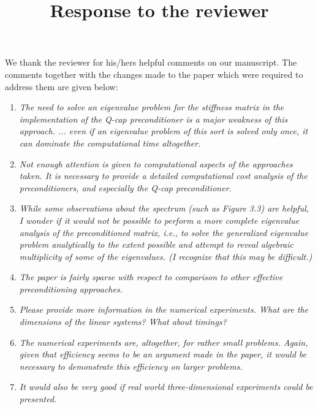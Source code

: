 \documentclass[10pt, a4paper]{article}
\title{\large{Response to the reviewer}}
\date{}
\begin{document}
\maketitle

We thank the reviewer for his/hers helpful comments on our manuscript. The
comments together with the changes made to the paper which were required to
address them are given below:
\begin{enumerate}
  \item{\textit{
The need to solve an eigenvalue problem for the stiffness matrix in the implementation 
of the Q-cap preconditioner is a major weakness of this approach. ... even if an eigenvalue 
problem of this sort is solved only once, it can dominate the computational time altogether.
}
}
  \item{\textit{
Not enough attention is given to computational aspects of the approaches taken. It is 
necessary to provide a detailed computational cost analysis of the preconditioners, 
and especially the Q-cap preconditioner. 
}
}
  \item{\textit{
While some observations about the spectrum (such as Figure 3.3) are helpful, I wonder if 
it would not be possible to perform a more complete eigenvalue analysis of the preconditioned 
matrix, i.e., to solve the generalized eigenvalue problem analytically to the extent possible 
and attempt to reveal algebraic multiplicity of some of the eigenvalues. (I recognize that this 
may be difficult.)
}
}
  \item{\textit{
The paper is fairly sparse with respect to comparison to other effective preconditioning approaches.
  }
}
  \item{\textit{
Please provide more information in the numerical experiments. What are the dimensions 
    of the linear systems? What about timings?
    }
}
  \item{\textit{
The numerical experiments are, altogether, for rather small problems. Again, given 
that efficiency seems to be an argument made in the paper, it would be necessary 
to demonstrate this efficiency on larger problems. 
  }
}
  \item{\textit{
It would also be very good if real world three-dimensional experiments could be presented.
    }
}

\end{enumerate}
\end{document}
